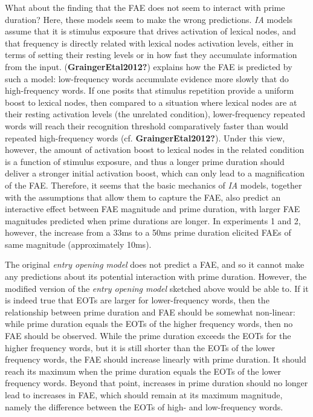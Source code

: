 \documentclass[
]{interact}
\begin{document}
What about the finding that the FAE does not seem to interact with prime
duration? Here, these models seem to make the wrong predictions.
\emph{IA} models assume that it is stimulus exposure that drives
activation of lexical nodes, and that frequency is directly related with
lexical nodes activation levels, either in terms of setting their
resting levels or in how fast they accumulate information from the
input. (\textbf{GraingerEtal2012?}) explains how the FAE is predicted by
such a model: low-frequency words accumulate evidence more slowly that
do high-frequency words. If one posits that stimulus repetition provide
a uniform boost to lexical nodes, then compared to a situation where
lexical nodes are at their resting activation levels (the unrelated
condition), lower-frequency repeated words will reach their recognition
threshold comparatively faster than would repeated high-frequency words
(cf. \textbf{GraingerEtal2012?}). Under this view, however, the amount
of activation boost to lexical nodes in the related condition is a
function of stimulus exposure, and thus a longer prime duration should
deliver a stronger initial activation boost, which can only lead to a
magnification of the FAE. Therefore, it seems that the basic mechanics
of \emph{IA} models, together with the assumptions that allow them to
capture the FAE, also predict an interactive effect between FAE
magnitude and prime duration, with larger FAE magnitudes predicted when
prime durations are longer. In experiments 1 and 2, however, the
increase from a 33ms to a 50ms prime duration elicited FAEs of same
magnitude (approximately 10ms).

The original \emph{entry opening model} does not predict a FAE, and so
it cannot make any predictions about its potential interaction with
prime duration. However, the modified version of the \emph{entry opening
model} sketched above would be able to. If it is indeed true that EOTs
are larger for lower-frequency words, then the relationship between
prime duration and FAE should be somewhat non-linear: while prime
duration equals the EOTs of the higher frequency words, then no FAE
should be observed. While the prime duration exceeds the EOTs for the
higher frequency words, but it is still shorter than the EOTs of the
lower frequency words, the FAE should increase linearly with prime
duration. It should reach its maximum when the prime duration equals the
EOTs of the lower frequency words. Beyond that point, increases in prime
duration should no longer lead to increases in FAE, which should remain
at its maximum magnitude, namely the difference between the EOTs of
high- and low-frequency words.
\end{document}
